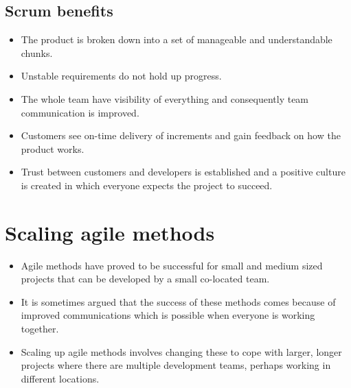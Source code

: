 \subsection{ Scrum benefits}
\begin{itemize}

\item The product is broken down into a set of manageable and understandable chunks.

\item Unstable requirements do not hold up progress.

\item The whole team have visibility of everything and consequently team communication is improved.

\item Customers see on-time delivery of increments and gain feedback on how the product works.

\item Trust between customers and developers is established and a positive culture is created in which everyone expects the project to succeed.

\end{itemize}
\section{ Scaling agile methods}
\begin{itemize}

\item Agile methods have proved to be successful for small and medium sized projects that can be developed by a small co-located team.

\item It is sometimes argued that the success of these methods comes because of improved communications which is possible when everyone is working together.

\item Scaling up agile methods involves changing these to cope with larger, longer projects where there are multiple development teams, perhaps working in different locations.

\end{itemize}

